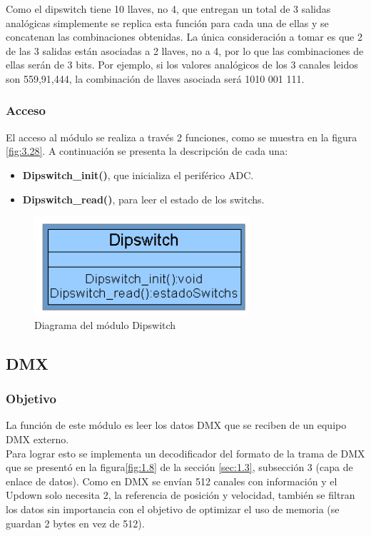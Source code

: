 Como el dipswitch tiene 10 llaves, no 4, que entregan un total de 3 salidas analógicas simplemente se replica esta función para cada una de ellas y se concatenan las combinaciones obtenidas. La única consideración a tomar es que 2 de las 3 salidas están asociadas a 2 llaves, no a 4, por lo que las combinaciones de ellas serán de 3 bits. Por ejemplo, si los valores analógicos de los 3 canales leidos son 559,91,444, la combinación de llaves asociada será 1010 001 111.

\subsubsection{Acceso}
El acceso al módulo se realiza a través 2 funciones, como se muestra en la figura \ref{fig:3.28}. A continuación se presenta la descripción de cada una:
\begin{itemize}
	\item \textbf{Dipswitch\_init()}, que inicializa el periférico ADC.
	\item \textbf{Dipswitch\_read()}, para leer el estado de los switchs.
\end{itemize}

\begin{figure}[!ht]
	\centering
	\includegraphics[width=8cm,scale=1]{resources/3_28-moduloDipswitch.png}
	\caption{Diagrama del módulo Dipswitch}
	\label{fig:\thefigure}
\end{figure}

\subsection{DMX}
\subsubsection{Objetivo}
La función de este módulo es leer los datos DMX que se reciben de un equipo DMX externo. \\
Para lograr esto se implementa un decodificador del formato de la trama de DMX que se presentó en la figura\ref{fig:1.8} de la sección \ref{sec:1.3}, subsección 3 (capa de enlace de datos). Como en DMX se envían 512 canales con información y el Updown solo necesita 2, la referencia de posición y velocidad, también se filtran los datos sin importancia con el objetivo de optimizar el uso de memoria (se guardan 2 bytes en vez de 512).

